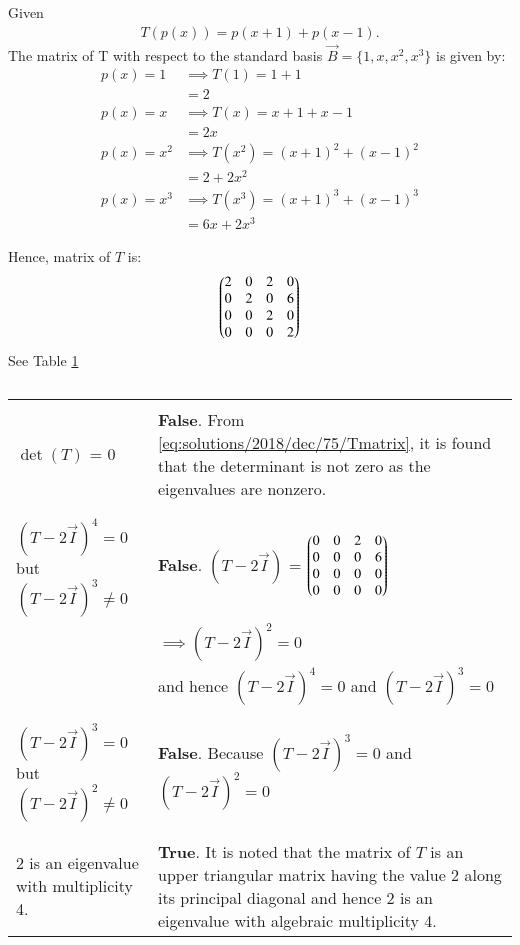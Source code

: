 Given 
\begin{align}
T(p(x)) = p(x+1)+p(x-1).
\end{align}
The matrix of T with respect to the standard basis $\vec{B}=\{1, x, x^2, x^3\}$ is given by:
\begin{align}
p(x)=1 &\implies T(1) = 1 + 1 \nonumber \\
&= 2\\
p(x)=x &\implies T(x) = x+1 + x-1 \nonumber\\
&= 2x \\
p(x)=x^2 &\implies T(x^2) = (x+1)^2 + (x-1)^2 \nonumber\\
&= 2 + 2x^2 \\
p(x)=x^3 &\implies T(x^3) = (x+1)^3 + (x-1)^3 \nonumber\\
&= 6x + 2x^3 
\end{align}

Hence, matrix of $T$ is:
\begin{align}
	\begin{pmatrix}2 & 0 & 2 & 0 \\ 0 & 2 & 0 & 6\\ 0 & 0 & 2 & 0\\0 & 0 & 0 & 2\end{pmatrix}\label{eq:solutions/2018/dec/75/Tmatrix}
\end{align} 
See Table \ref{eq:solutions/2018/dec/75/table}
%
\begin{table}[h]
	\begin{tabular}{|m{3cm}|m{5cm}|}
		\hline
		&\\
		$\det(T)$ = 0 
		& \textbf{False}. From \eqref{eq:solutions/2018/dec/75/Tmatrix}, it is found that the determinant is not zero as the eigenvalues are nonzero.\\
		& \\
		\hline
		&\\
		$(T-2\vec{I})^4=0$ but $(T-2\vec{I})^3 \ne 0$
		& \textbf{False}. 
		$(T-2\vec{I})$
		 = $\begin{pmatrix}0 & 0 & 2 & 0 \\ 0 & 0 & 0 & 6\\ 0 & 0 & 0 & 0\\0 & 0 & 0 & 0\end{pmatrix}$\\
		& $\implies (T - 2\vec{I})^2 = 0$\\
		&and hence $(T-2\vec{I})^4=0$ and $(T-2\vec{I})^3 = 0$ \\
		&\\
		\hline
		&\\
	    $(T-2\vec{I})^3=0$ but $(T-2\vec{I})^2 \ne 0$
		& \textbf{False}. Because $(T-2\vec{I})^3=0$ and $(T-2\vec{I})^2 = 0$\\
		&\\
		\hline
		&\\
		2 is an eigenvalue with multiplicity 4.
		& \textbf{True}. It is noted that the matrix of $T$ is an upper triangular matrix having the value 2 along its principal diagonal and hence 2 is an eigenvalue with algebraic multiplicity 4.\\
		\hline
	\end{tabular}
\caption{}
\label{eq:solutions/2018/dec/75/table}
\end{table}
